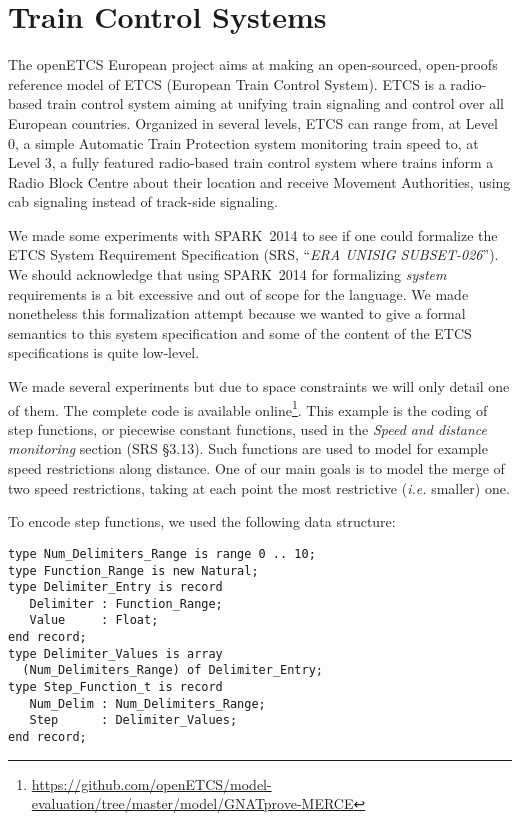 \documentclass[10pt,a4paper,twocolumn]{article}
\newcommand{\openetcs}{openETCS\xspace}
\newcommand{\newspark}{SPARK~2014\xspace}
\newcommand{\ie}{\textit{i.e.}\xspace}
\begin{document}
\section{Train Control Systems}
\label{sec:openETCS}



The \openetcs European project aims at making an open-sourced,
open-proofs reference model of ETCS (European Train Control
System). ETCS is a radio-based train control system aiming at unifying
train signaling and control over all European countries. Organized in
several levels, ETCS can range from, at Level 0, a simple Automatic
Train Protection system monitoring train speed to, at Level 3, a fully
featured radio-based train control system where trains inform a Radio
Block Centre about their location and receive Movement Authorities,
using cab signaling instead of track-side signaling.

We made some experiments with \newspark to see if one could formalize
the ETCS System Requirement Specification (SRS, ``\emph{ERA UNISIG
SUBSET-026}''). We should acknowledge that using \newspark for
formalizing \emph{system} requirements is a bit excessive and out of
scope for the language. We made nonetheless this formalization attempt
because we wanted to give a formal semantics to this system
specification and some of the content of the ETCS specifications is
quite low-level.


We made several experiments but due to space constraints we will only
detail one of them. The complete code is available
online\footnote{\url{https://github.com/openETCS/model-evaluation/tree/master/model/GNATprove-MERCE}}.
This example is the coding of step functions, or piecewise constant
functions, used in the \textit{Speed and distance monitoring} section
(SRS §3.13). Such functions are used to model for example speed
restrictions along distance. One of our main goals is to model the
merge of two speed restrictions, taking at each point the most
restrictive (\ie smaller) one.

To encode step functions, we used the following data structure:
\begin{lstlisting}
type Num_Delimiters_Range is range 0 .. 10;
type Function_Range is new Natural;
type Delimiter_Entry is record
   Delimiter : Function_Range;
   Value     : Float;
end record;
type Delimiter_Values is array
  (Num_Delimiters_Range) of Delimiter_Entry;
type Step_Function_t is record
   Num_Delim : Num_Delimiters_Range;
   Step      : Delimiter_Values;
end record;
\end{lstlisting}
\end{document}

